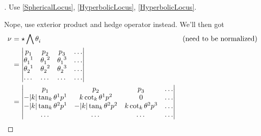\documentclass[stu, babel, american, biblatex, a4paper, leqno, draftall]{apa7}
\begin{document}
\begin{proof}[]
    \skipped

    Use \cref{SphericalLocus}, \cref{HyperbolicLocus}, \cref{HyperbolicLocus}.

    Nope, use exterior product and hedge operator instead.
    We'll then got
    \begin{align*}
        \tensor{\nu}{}
                    & = \star\bigwedge{\tensor{\theta}{_i}}                                                                        & \text{(need to be normalized)} \\
                    & = \left\vert
        \begin{matrix}
            \tensor{p}{_1}        & \tensor{p}{_2}        & \tensor{p}{_3}        & \dots \\
            \tensor{\theta}{_1^1} & \tensor{\theta}{_1^2} & \tensor{\theta}{_1^3} & \dots \\
            \tensor{\theta}{_2^1} & \tensor{\theta}{_2^2} & \tensor{\theta}{_2^3} & \dots \\
            \dots                 & \dots                 & \dots                 & \dots \\
        \end{matrix}
        \right\vert                                                                                                                                                 \\
                    & = \left\vert
        \begin{matrix}
            \tensor{p}{_1}                                    & \tensor{p}{_2}                                    & \tensor{p}{_3}                             & \dots \\
            -\abs{k}\tan_k{\tensor{\theta}{^1}}\tensor{p}{^1} & k\cot_k{\tensor{\theta}{^1}}\tensor{p}{^2}        & 0                                          & \dots \\
            -\abs{k}\tan_k{\tensor{\theta}{^2}}\tensor{p}{^1} & -\abs{k}\tan_k{\tensor{\theta}{^2}}\tensor{p}{^2} & k\cot_k{\tensor{\theta}{^2}}\tensor{p}{^3} & \dots \\
            \dots                                             & \dots                                             & \dots                                      & \dots \\
        \end{matrix}
        \right\vert                                                                                                                                                 \\

\end{align*}
\end{proof}
\end{document}
